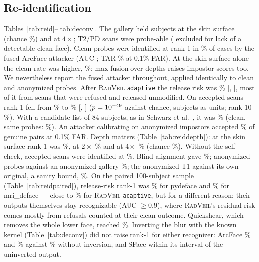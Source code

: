 \documentclass[11pt]{article}
\newcommand{\rv}{\textsc{RadVeil}}
\newcommand{\code}[1]{\texttt{#1}}
\begin{document}
\subsection{Re-identification}
Tables~\ref{tab:reid}--\ref{tab:deconv}. The gallery held \reidArcFaceGallery{}
subjects at the skin surface (chance \reidArcFaceChance\%) and
\reidArcFaceGalleryFour{} at $4\times$; \reidArcFaceProbeScans{} T2/PD scans
were probe-able (\reidArcFaceExcluded{} excluded for lack of a detectable
clean face). Clean probes were identified at rank 1 in
\reidArcFaceControlRankFused\% of cases by the fused ArcFace attacker
(AUC \reidArcFaceControlAuc; TAR \reidArcFaceControlTar\% at 0.1\% FAR). At
the skin surface alone the clean rate was higher,
\reidArcFaceControlRankOne\%: max-fusion over depths raises impostor scores
too. We nevertheless report the fused attacker throughout, applied
identically to clean and anonymized probes. After
\rv{} \code{adaptive} the release risk was \reidArcFaceAdaptiveRisk\%
[\reidArcFaceAdaptiveRiskLo, \reidArcFaceAdaptiveRiskHi], most of it from
scans that were refused and released unmodified. On accepted scans rank-1
fell from \reidArcFaceAdaptiveAccControl\% to \reidArcFaceAdaptiveAccRank\%
[\reidArcFaceAdaptiveAccRankLo, \reidArcFaceAdaptiveAccRankHi]
($p=10^{-49}$ against chance, subjects as units; rank-10
\reidArcFaceAdaptiveAccTenRank\%). With a candidate list of 84 subjects, as
in Schwarz et al.~\cite{schwarz2019}, it was
\reidArcFaceAdaptiveRankAtEightyFour\% (clean, same probes:
\reidArcFaceAdaptiveControlRankAtEightyFour\%). An attacker calibrating on
anonymized impostors accepted \reidArcFaceAdaptiveAccTarAnonCal\% of genuine
pairs at 0.1\% FAR. Depth matters (Table~\ref{tab:reiddepth}): at the skin
surface rank-1 was \reidArcFaceAdaptiveAccDepthOne\%, at $2\times$
\reidArcFaceAdaptiveAccDepthTwo\% and at $4\times$
\reidArcFaceAdaptiveAccDepthFour\% (chance \reidArcFaceAdaptiveAccDepthFourChance\%).
Without the self-check, accepted scans were identified at
\reidArcFaceAdaptiveNoverifyAccRank\%. Blind alignment gave
\reidArcFaceAdaptiveBlindRank\%; anonymized probes against an anonymized
gallery \reidArcFaceAdaptiveMatchedRank\%; the anonymized T1 against its own
original, a sanity bound, \reidArcFaceAdaptiveSameRank\%. On the paired
100-subject sample (Table~\ref{tab:reidpaired}), release-risk rank-1 was
\reidArcFacePairedPydefaceRank\% for pydeface and
\reidArcFacePairedMriDefaceRank\% for mri\_deface --- close to
\reidArcFacePairedAdaptiveRank\% for \rv{} \code{adaptive}, but for a
different reason: their outputs themselves stay recognizable (AUC
$\ge0.9$), where \rv{}'s residual risk comes mostly from refusals counted
at their clean outcome. Quickshear, which removes the whole lower face,
reached \reidArcFacePairedQuickshearRank\%. Inverting the blur with the
known kernel
(Table~\ref{tab:deconv}) did not raise rank-1 for either recognizer: ArcFace
\deconvArcFaceSigma\% and \deconvArcFaceSigmaXAdaptive\% against
\deconvArcFacePlain\% without inversion, and SFace within its interval of
the uninverted output.
\end{document}
